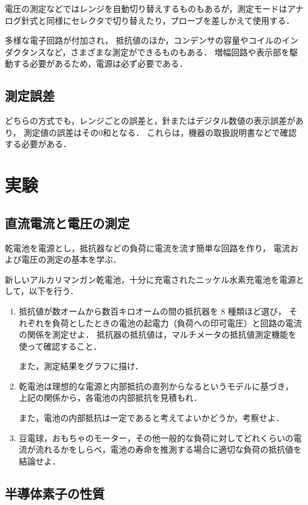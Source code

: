 \documentclass[11pt,sort]{jarticle}
\begin{document}
電圧の測定などではレンジを自動切り替えするものもあるが，測定モードはアナログ針式と同様にセレクタで切り替えたり，プローブを差しかえて使用する．

多様な電子回路が付加され，
抵抗値のほか，コンデンサの容量やコイルのインダクタンスなど，さまざまな測定ができるものもある．
増幅回路や表示部を駆動する必要があるため，電源は必ず必要である．

\subsection{測定誤差}

どちらの方式でも，レンジごとの誤差と，針またはデジタル数値の表示誤差があり，
測定値の誤差はその0和となる．
これらは，機器の取扱説明書などで確認する必要がある．


\section{実験}

\subsection{直流電流と電圧の測定}\label{a}

乾電池を電源とし，抵抗器などの負荷に電流を流す簡単な回路を作り，
電流および電圧の測定の基本を学ぶ．

新しいアルカリマンガン乾電池，十分に充電されたニッケル水素充電池を電源として，以下を行う．
\begin{enumerate}
\item
抵抗値が数オームから数百キロオームの間の抵抗器を 8 種類ほど選び，
それぞれを負荷としたときの電池の起電力（負荷への印可電圧）と回路の電流の関係を測定せよ．
抵抗器の抵抗値は，マルチメータの抵抗値測定機能を使って確認すること．

また，測定結果をグラフに描け．
\item
乾電池は理想的な電源と内部抵抗の直列からなるというモデルに基づき，
上記の関係から，各電池の内部抵抗を見積もれ．

また，電池の内部抵抗は一定であると考えてよいかどうか，考察せよ．
\item
豆電球，おもちゃのモーター，その他一般的な負荷に対してどれくらいの電流が流れるかをしらべ，電池の寿命を推測する場合に適切な負荷の抵抗値を結論せよ．
\end{enumerate}

\subsection{半導体素子の性質}\label{b}
\end{document}
